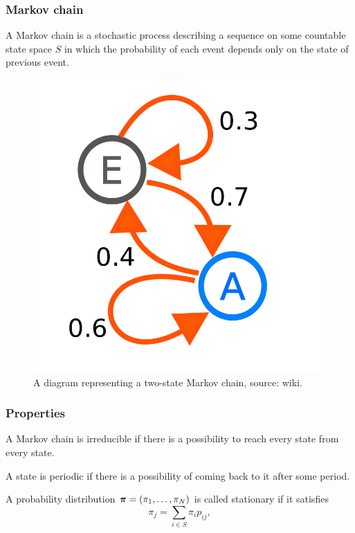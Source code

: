 \begin{frame}
	\frametitle{Markov chain}
	\begin{definition}
		A Markov chain is a stochastic process describing a sequence on some countable state space $S$ in which the probability of each event depends only on the state of previous event.
	\end{definition}
	\begin{figure}[!htb]
		\includegraphics[scale=0.15]{img/Markov_diagram.png}
		\caption{A diagram representing a two-state Markov chain, source: wiki.}
	\end{figure}
\end{frame}

\begin{frame}
	\frametitle{Properties}
	\begin{definition}[Irreducibility]
		A Markov chain is irreducible if there is a possibility to reach every state from every state.
	\end{definition}

	\begin{definition}[Periodicity]
		A state is periodic if there is a possibility of coming back to it after some period.
	\end{definition}

	\begin{definition}[Stationarity]
		A probability distribution $\boldsymbol{\pi} = (\pi_1, \ldots, \pi_N)$ is called stationary if it satisfies
		\begin{equation*}
		\pi_j = \sum_{i \in S} \pi_i p_{ij},
		\end{equation*}
	\end{definition}
\end{frame}

